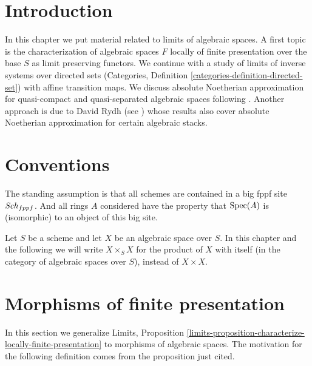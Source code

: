 \section{Introduction}
\label{spaces-limits-section-introduction}
In this chapter we put material related to limits of algebraic spaces.
A first topic is the characterization of algebraic spaces $F$ locally
of finite presentation over the base $S$ as limit preserving functors.
We continue with a study of limits of inverse systems over
directed sets (Categories, Definition \ref{categories-definition-directed-set})
with affine transition maps. We discuss absolute
Noetherian approximation for quasi-compact and quasi-separated algebraic
spaces following \cite{CLO}. Another approach is due to David Rydh (see
\cite{rydh_approx}) whose results also cover absolute Noetherian
approximation for certain algebraic stacks.

\section{Conventions}
\label{spaces-limits-section-conventions}
The standing assumption is that all schemes are contained in
a big fppf site $\mathit{Sch}_{fppf}$. And all rings $A$ considered
have the property that $\operatorname{Spec}(A)$ is (isomorphic) to an
object of this big site.

\medskip\noindent
Let $S$ be a scheme and let $X$ be an algebraic space over $S$.
In this chapter and the following we will write $X \times_S X$
for the product of $X$ with itself (in the category of algebraic
spaces over $S$), instead of $X \times X$.

\section{Morphisms of finite presentation}
\label{spaces-limits-section-finite-presentation}
In this section we generalize
Limits, Proposition
\ref{limits-proposition-characterize-locally-finite-presentation}
to morphisms of algebraic spaces.
The motivation for the following definition comes from
the proposition just cited.

